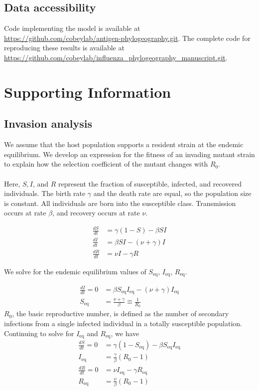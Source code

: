 \documentclass[10pt]{article}
\begin{document}
\subsection{Data accessibility}
Code implementing the model is available at \url{https://github.com/cobeylab/antigen-phylogeography.git}. 
The complete code for reproducing these results is available at \url{https://github.com/cobeylab/influenza_phylogeography_manuscript.git}.



\makeatletter
\renewcommand*\thefigure{S\arabic{figure}}
\renewcommand*\thetable{S\arabic{table}}
\makeatother
\setcounter{figure}{0}
\setcounter{table}{0}

\newpage
\section{Supporting Information}
\setlength{\parindent}{0cm}
\subsection{Invasion analysis}
We assume that the host population supports a resident strain at the endemic equilibrium. 
We develop an expression for the fitness of an invading mutant strain to explain how the selection coefficient of the mutant changes with $R_0$.\\\\
Here, $S,I$, and $R$ represent the fraction of susceptible, infected, and recovered individuals.
The birth rate $\gamma$ and the death rate are equal, so the population size is constant. 
All individuals are born into the susceptible class. 
Transmission occurs at rate $\beta$, and recovery occurs at rate $\nu$.

\begin{align*}
\frac{dS}{dt} &= \gamma (1-  S ) -\beta S I \\
\frac{dI}{dt}&= \beta S I - (\nu + \gamma) I\\
\frac{dR}{dt}&= \nu I - \gamma R
\end{align*}

We solve for the endemic equilibrium values of $S_\text{eq}$, $I_\text{eq}$, $R_\text{eq}$.

\begin{align*}
\frac{dI}{dt}=  0 &=\beta S_\text{eq} I_\text{eq} - (\nu + \gamma) I_\text{eq}\\
S_\text{eq} &= \frac{\nu + \gamma}{\beta} \equiv \frac{1}{R_0}
\end{align*}
$R_0$, the basic reproductive number, is defined as the number of secondary infections from a single infected individual in a totally susceptible population. 
Continuing to solve for $I_\text{eq}$ and $R_\text{eq}$, we have
\begin{align*}
\frac{dS}{dt}=  0 &=\gamma (1-  S_\text{eq} ) -\beta S_\text{eq} I_\text{eq} \\
I_\text{eq}&=\frac{\gamma}{\beta}(R_0-1)\\
\frac{dR}{dt} = 0 &= \nu I_\text{eq} - \gamma R_\text{eq}\\
R_\text{eq}&=\frac{\nu}{\beta}(R_0-1)
\end{align*}
\end{document}
